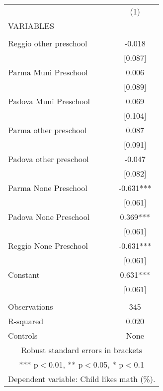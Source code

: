 \begin{tabular}{lc} \hline
 & (1) \\
VARIABLES &  \\ \hline
 &  \\
Reggio other preschool & -0.018 \\
 & [0.087] \\
Parma Muni Preschool & 0.006 \\
 & [0.089] \\
Padova Muni Preschool & 0.069 \\
 & [0.104] \\
Parma other preschool & 0.087 \\
 & [0.091] \\
Padova other preschool & -0.047 \\
 & [0.082] \\
Parma None Preschool & -0.631*** \\
 & [0.061] \\
Padova None Preschool & 0.369*** \\
 & [0.061] \\
Reggio None Preschool & -0.631*** \\
 & [0.061] \\
Constant & 0.631*** \\
 & [0.061] \\
 &  \\
Observations & 345 \\
R-squared & 0.020 \\
 Controls & None \\ \hline
\multicolumn{2}{c}{ Robust standard errors in brackets} \\
\multicolumn{2}{c}{ *** p$<$0.01, ** p$<$0.05, * p$<$0.1} \\
\multicolumn{2}{c}{ Dependent variable: Child likes math (\%).} \\
\end{tabular}
